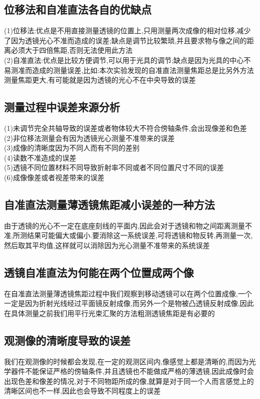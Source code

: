 \documentclass[a4 paper,12pt]{article}
\begin{document}
\subsection{位移法和自准直法各自的优缺点}
\noindent
(1)位移法:优点是不用直接测量透镜的位置上,只用测量两次成像的相对位移,减少了因为透镜光心不准而造成的误差;缺点是调节比较繁琐,并且要求物与像之间的距离必须大于四倍焦距,否则无法使用此方法\\
(2)自准直法:优点是比较方便调节,可以用于光具的调节;缺点是因为光具的中心不易测准而造成的测量误差,比如:本次实验发现的自准直法测量焦距总是比另外方法测量焦距更大,有可能就是因为透镜的光心不在中央导致的误差
\subsection{测量过程中误差来源分析}
\noindent
(1)未调节完全共轴导致的误差或者物体较大不符合傍轴条件,会出现像差和色差\\
(2)非位移法测量会有因为透镜光心测量不准带来的误差\\
(3)成像的清晰度因为不同人而有不同的差别\\
(4)读数不准造成的误差\\
(5)透镜不同位置材料不同导致折射率不同或者不同位置尺寸不同的误差\\
(6)成像像差或者视差带来的误差
\subsection{自准直法测量薄透镜焦距减小误差的一种方法}
由于透镜的光心不一定在底座刻线的平面内,因此会对于透镜和物之间距离测量不准,所测结果可能偏大或偏小.要消除这一系统误差,可将透镜和物反转,再测量一次,然后取其平均值,这样就可以消除因为光心测量不准带来的系统误差
\subsection{透镜自准直法为何能在两个位置成两个像}
在自准直法测量薄透镜焦距过程中我们观察到移动透镜可以在两个位置成像,一个一定是因为折射光线经过平面镜反射成像,而另外一个是物被凸透镜反射成像,因此在具体测量之前我们用平行光束汇聚的方法粗测透镜焦距是有必要的
\subsection{观测像的清晰度导致的误差}
我们在观测像的时候都会发现,在一定的观测区间内,像感觉上都是清晰的,而因为光学器件不能保证严格的傍轴条件,并且透镜也不能做成严格的薄透镜,因此成像时会出现色差和像差的情况,对于不同物距所成的像,就算是对于同一个人而言感觉上的清晰区间也不一样,因此也会导致不同程度上的误差
\end{document}
